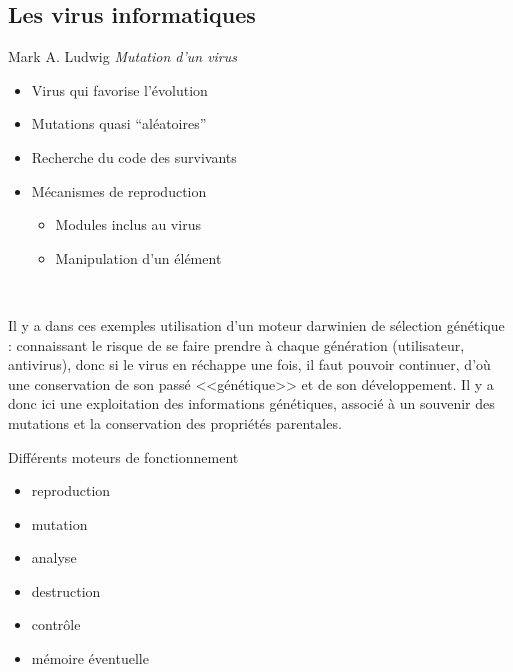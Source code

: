 \documentclass[11pt,twoside,a4paper]{article}
\begin{document}
\subsection{Les virus informatiques}

Mark A. Ludwig \textit{Mutation d'un virus}
\begin{itemize}
	\item Virus qui favorise l'{\'e}volution
	\item Mutations quasi ``al{\'e}atoires''
	\item Recherche du code des survivants
	\item M{\'e}canismes de reproduction
	\begin{itemize}	
		\item Modules inclus au virus
		\item Manipulation d'un {\'e}l{\'e}ment
		\end{itemize}
\end{itemize}~\\

\begin{minipage}{0.6\linewidth}
Il y a dans ces exemples utilisation d'un moteur darwinien de s{\'e}lection g{\'e}n{\'e}tique : connaissant le risque de se faire prendre {\`a} chaque g{\'e}n{\'e}ration (utilisateur, antivirus), donc si le virus en r{\'e}chappe une fois, il faut pouvoir continuer, d'o{\`u} une conservation de son pass{\'e} <<g{\'e}n{\'e}tique>> et de son d{\'e}veloppement. Il y a donc ici une exploitation des informations g{\'e}n{\'e}tiques, associ{\'e} {\`a} un souvenir des mutations et la conservation des propri{\'e}t{\'e}s parentales.
\end{minipage}
\begin{minipage}{0.1\linewidth}\end{minipage}
\begin{minipage}{0.3\linewidth}
Diff{\'e}rents moteurs de fonctionnement
\begin{itemize}
	\item reproduction
	\item mutation
	\item analyse
	\item destruction
	\item contr{\^o}le
	\item m{\'e}moire {\'e}ventuelle
\end{itemize}
\end{minipage}~\\~\\
\end{document}
